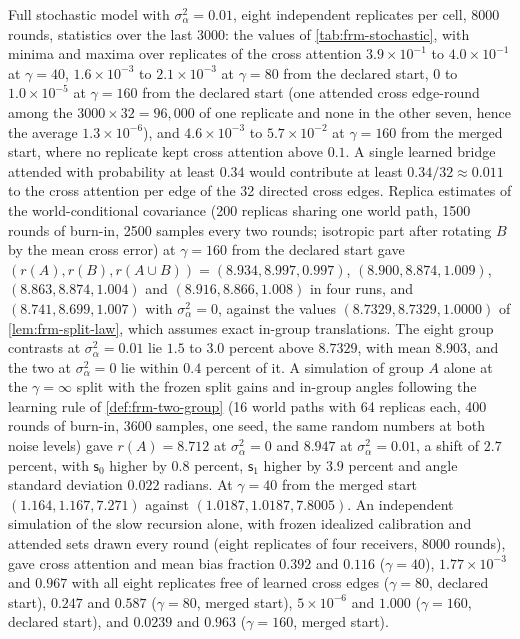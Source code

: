\begin{numcheck}\label{chk:frm-stochastic}
Full stochastic model with $\sigma_\alpha^2=0.01$, eight independent replicates per cell, 8000 rounds, statistics over the last 3000: the values of \cref{tab:frm-stochastic}, with minima and maxima over replicates of the cross attention $3.9\times10^{-1}$ to $4.0\times10^{-1}$ at $\gamma=40$, $1.6\times10^{-3}$ to $2.1\times10^{-3}$ at $\gamma=80$ from the declared start, $0$ to $1.0\times10^{-5}$ at $\gamma=160$ from the declared start (one attended cross edge-round among the $3000\times32=96{,}000$ of one replicate and none in the other seven, hence the average $1.3\times10^{-6}$), and $4.6\times10^{-3}$ to $5.7\times10^{-2}$ at $\gamma=160$ from the merged start, where no replicate kept cross attention above $0.1$. A single learned bridge attended with probability at least $0.34$ would contribute at least $0.34/32\approx0.011$ to the cross attention per edge of the 32 directed cross edges. Replica estimates of the world-conditional covariance (200 replicas sharing one world path, 1500 rounds of burn-in, 2500 samples every two rounds; isotropic part after rotating $B$ by the mean cross error) at $\gamma=160$ from the declared start gave $(r(A),r(B),r(A\cup B))=(8.934,8.997,0.997)$, $(8.900,8.874,1.009)$, $(8.863,8.874,1.004)$ and $(8.916,8.866,1.008)$ in four runs, and $(8.741,8.699,1.007)$ with $\sigma_\alpha^2=0$, against the values $(8.7329,8.7329,1.0000)$ of \cref{lem:frm-split-law}, which assumes exact in-group translations. The eight group contrasts at $\sigma_\alpha^2=0.01$ lie $1.5$ to $3.0$ percent above $8.7329$, with mean $8.903$, and the two at $\sigma_\alpha^2=0$ lie within $0.4$ percent of it. A simulation of group $A$ alone at the $\gamma=\infty$ split with the frozen split gains and in-group angles following the learning rule of \cref{def:frm-two-group} (16 world paths with 64 replicas each, 400 rounds of burn-in, 3600 samples, one seed, the same random numbers at both noise levels) gave $r(A)=8.712$ at $\sigma_\alpha^2=0$ and $8.947$ at $\sigma_\alpha^2=0.01$, a shift of $2.7$ percent, with $\mathsf s_0$ higher by $0.8$ percent, $\mathsf s_1$ higher by $3.9$ percent and angle standard deviation $0.022$ radians. At $\gamma=40$ from the merged start $(1.164,1.167,7.271)$ against $(1.0187,1.0187,7.8005)$. An independent simulation of the slow recursion alone, with frozen idealized calibration and attended sets drawn every round (eight replicates of four receivers, 8000 rounds), gave cross attention and mean bias fraction $0.392$ and $0.116$ ($\gamma=40$), $1.77\times10^{-3}$ and $0.967$ with all eight replicates free of learned cross edges ($\gamma=80$, declared start), $0.247$ and $0.587$ ($\gamma=80$, merged start), $5\times10^{-6}$ and $1.000$ ($\gamma=160$, declared start), and $0.0239$ and $0.963$ ($\gamma=160$, merged start).
\end{numcheck}

